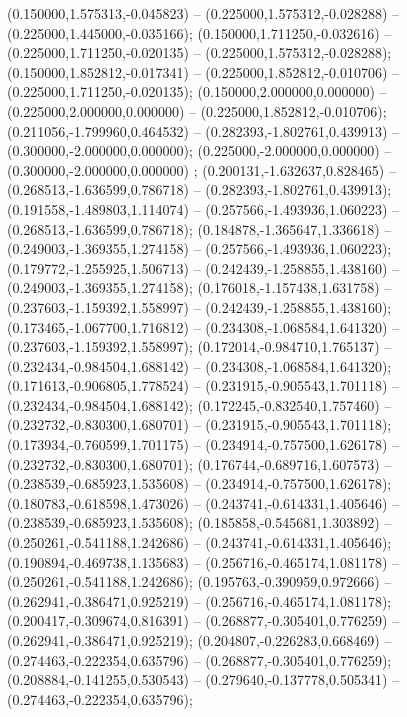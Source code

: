  (0.150000,1.575313,-0.045823) -- (0.225000,1.575312,-0.028288) -- (0.225000,1.445000,-0.035166);
 (0.150000,1.711250,-0.032616) -- (0.225000,1.711250,-0.020135) -- (0.225000,1.575312,-0.028288);
 (0.150000,1.852812,-0.017341) -- (0.225000,1.852812,-0.010706) -- (0.225000,1.711250,-0.020135);
 (0.150000,2.000000,0.000000) -- (0.225000,2.000000,0.000000) -- (0.225000,1.852812,-0.010706);
 (0.211056,-1.799960,0.464532) -- (0.282393,-1.802761,0.439913) -- (0.300000,-2.000000,0.000000);
 (0.225000,-2.000000,0.000000) -- (0.300000,-2.000000,0.000000) ;
 (0.200131,-1.632637,0.828465) -- (0.268513,-1.636599,0.786718) -- (0.282393,-1.802761,0.439913);
 (0.191558,-1.489803,1.114074) -- (0.257566,-1.493936,1.060223) -- (0.268513,-1.636599,0.786718);
 (0.184878,-1.365647,1.336618) -- (0.249003,-1.369355,1.274158) -- (0.257566,-1.493936,1.060223);
 (0.179772,-1.255925,1.506713) -- (0.242439,-1.258855,1.438160) -- (0.249003,-1.369355,1.274158);
 (0.176018,-1.157438,1.631758) -- (0.237603,-1.159392,1.558997) -- (0.242439,-1.258855,1.438160);
 (0.173465,-1.067700,1.716812) -- (0.234308,-1.068584,1.641320) -- (0.237603,-1.159392,1.558997);
 (0.172014,-0.984710,1.765137) -- (0.232434,-0.984504,1.688142) -- (0.234308,-1.068584,1.641320);
 (0.171613,-0.906805,1.778524) -- (0.231915,-0.905543,1.701118) -- (0.232434,-0.984504,1.688142);
 (0.172245,-0.832540,1.757460) -- (0.232732,-0.830300,1.680701) -- (0.231915,-0.905543,1.701118);
 (0.173934,-0.760599,1.701175) -- (0.234914,-0.757500,1.626178) -- (0.232732,-0.830300,1.680701);
 (0.176744,-0.689716,1.607573) -- (0.238539,-0.685923,1.535608) -- (0.234914,-0.757500,1.626178);
 (0.180783,-0.618598,1.473026) -- (0.243741,-0.614331,1.405646) -- (0.238539,-0.685923,1.535608);
 (0.185858,-0.545681,1.303892) -- (0.250261,-0.541188,1.242686) -- (0.243741,-0.614331,1.405646);
 (0.190894,-0.469738,1.135683) -- (0.256716,-0.465174,1.081178) -- (0.250261,-0.541188,1.242686);
 (0.195763,-0.390959,0.972666) -- (0.262941,-0.386471,0.925219) -- (0.256716,-0.465174,1.081178);
 (0.200417,-0.309674,0.816391) -- (0.268877,-0.305401,0.776259) -- (0.262941,-0.386471,0.925219);
 (0.204807,-0.226283,0.668469) -- (0.274463,-0.222354,0.635796) -- (0.268877,-0.305401,0.776259);
 (0.208884,-0.141255,0.530543) -- (0.279640,-0.137778,0.505341) -- (0.274463,-0.222354,0.635796);
